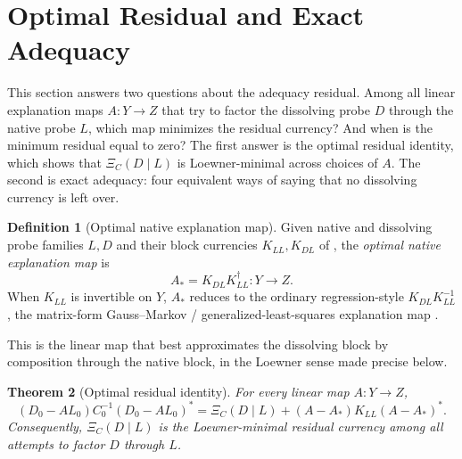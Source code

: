 \documentclass[11pt]{article}
\newtheorem{theorem}{Theorem}[section]
\theoremstyle{definition}
\newtheorem{definition}[theorem]{Definition}
\begin{document}
 \section{Optimal Residual and Exact Adequacy}
\label{sec:optimal-exact}

This section answers two questions about the adequacy residual.  Among all
linear explanation maps \(A\colon Y\to Z\) that try to factor the dissolving
probe \(D\) through the native probe \(L\), which map minimizes the residual
currency?  And when is the minimum residual equal to zero?  The first answer is
the optimal residual identity, which shows that \(\Xi_C(D\mid L)\) is
Loewner-minimal across choices of \(A\).  The second is exact adequacy: four
equivalent ways of saying that no dissolving currency is left over.

\begin{definition}[Optimal native explanation map]\label{def:xi:optimal-explanation-map}
Given native and dissolving probe families \(L,D\) and their block currencies
\(K_{LL},K_{DL}\) of , the \emph{optimal native
explanation map} is
\[
  A_*=K_{DL}K_{LL}^\dagger\colon Y\to Z.
\]
When \(K_{LL}\) is invertible on \(Y\), \(A_*\) reduces to the ordinary
regression-style \(K_{DL}K_{LL}^{-1}\), the matrix-form Gauss--Markov /
generalized-least-squares explanation map
\citep{Aitken1935LeastSquares,Rao1973LinearInference}.
\end{definition}

This is the linear map that best approximates the dissolving block by
composition through the native block, in the Loewner sense made precise below.

\begin{theorem}[Optimal residual identity]
\label{thm:xi:optimal-residual-identity}
For every linear map \(A\colon Y\to Z\),
\[
  \boxed{
  (D_0-AL_0)C_0^{-1}(D_0-AL_0)^*
  =
  \Xi_C(D\mid L)
  +(A-A_*)K_{LL}(A-A_*)^*.}
\]
Consequently, \(\Xi_C(D\mid L)\) is the Loewner-minimal residual currency
among all attempts to factor \(D\) through \(L\).
\end{theorem}
\end{document}
